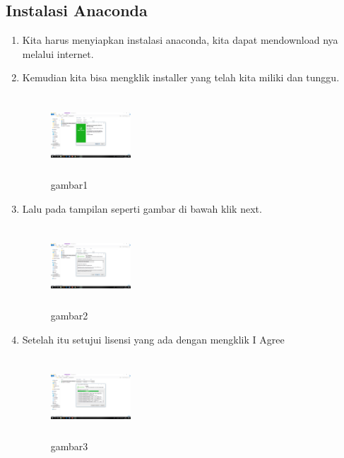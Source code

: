 \subsection{Instalasi Anaconda}
\begin{enumerate}
    \item Kita harus menyiapkan instalasi anaconda, kita dapat mendownload nya melalui internet.
    \item Kemudian kita bisa mengklik installer yang telah kita miliki dan tunggu.
    \begin{figure}[!htbp]
        \centering
        \includegraphics[width=3cm,height=3cm]{figures/1.png}
        \caption{gambar1}
        \label{awal}
        \end{figure}

    \item Lalu pada tampilan seperti gambar di bawah klik next.
    \begin{figure}[!htbp]
        \centering
        \includegraphics[width=3cm,height=3cm]{figures/2.png}
        \caption{gambar2}
        \label{next}
        \end{figure}

    \item Setelah itu setujui lisensi yang ada dengan mengklik I Agree
    \begin{figure}[!htbp]
        \centering
        \includegraphics[width=3cm,height=3cm]{figures/3.png}
        \caption{gambar3}
        \label{lisensi}
        \end{figure}


\end{enumerate}

